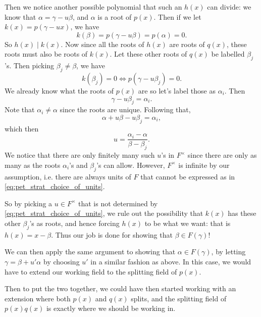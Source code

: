 \documentclass[notoc,notitlepage,nobib]{tufte-book}
\begin{document}
\begin{strategy}
  Then we notice another possible polynomial that such an $h(x)$ can divide: we
  know that $\alpha = \gamma - u \beta$, and $\alpha$ is a root of $p(x)$. Then
  if we let $k(x) = p(\gamma - u x)$, we have
  \begin{equation*}
    k(\beta) = p(\gamma - u \beta) = p(\alpha) = 0.
  \end{equation*}
  So $h(x) \mid k(x)$. Now since all the roots of $h(x)$ are roots of $q(x)$,
  these roots must also be roots of $k(x)$. Let these other roots of $q(x)$ be
  labelled $\beta_j$'s. Then picking $\beta_j \neq \beta$, we have
  \begin{equation*}
    k(\beta_j) = 0 \iff p(\gamma - u \beta_j) = 0.
  \end{equation*}
  We already know what the roots of $p(x)$ are so let's label those as
  $\alpha_i$. Then
  \begin{equation*}
    \gamma - u \beta_j = \alpha_i.
  \end{equation*}
  Note that $\alpha_i \neq \alpha$ since the roots are unique. Following that,
  \begin{equation*}
    \alpha + u \beta - u \beta_j = \alpha_i,
  \end{equation*}
  which then
  \begin{equation}\label{eq:pet_strat_choice_of_units}
    u = \frac{\alpha_i - \alpha}{\beta - \beta_j}.
  \end{equation}
  We notice that there are only finitely many such $u$'s in $F^\times$ since
  there are only as many as the roots $\alpha_i$'s and $\beta_j$'s can allow.
  However, $F^\times$ is infinite by our assumption, i.e. there are always units
  of $F$ that cannot be expressed as in \cref{eq:pet_strat_choice_of_units}.

  So by picking a $u \in F^\times$ that is not determined by
  \cref{eq:pet_strat_choice_of_units}, we rule out the possibility that
  $k(x)$ has these other $\beta_j$'s as roots, and hence forcing $h(x)$ to be
  what we want: that is $h(x) = x - \beta$. Thus our job is done for showing
  that $\beta \in F(\gamma)$!

  We can then apply the same argument to showing that $\alpha \in F(\gamma)$, by
  letting $\gamma = \beta + u' \alpha$ by choosing $u'$ in a similar fashion as
  above. In this case, we would have to extend our working field to the
  splitting field of $p(x)$.

  Then to put the two together, we could have then started working with an
  extension where both $p(x)$ and $q(x)$ splits, and the splitting field of
  $p(x) q(x)$ is exactly where we should be working in.
\end{strategy}
\end{document}
